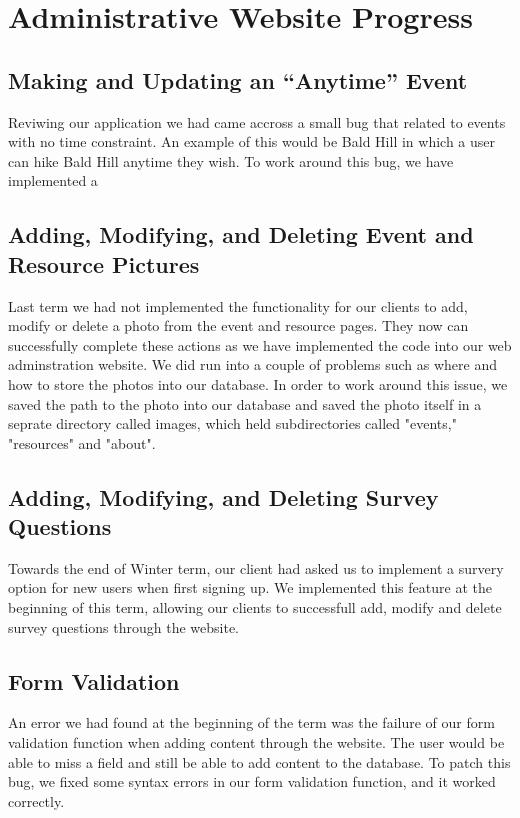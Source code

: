\documentclass[onecolumn, draftclsnofoot,10pt, compsoc]{IEEEtran}
\begin{document}
\section{Administrative Website Progress}

  \subsection{Making and Updating an “Anytime” Event}
  Reviwing our application we had came accross a small bug that related to events with no time constraint. An example of this would be Bald Hill in which a user can hike Bald Hill
  anytime they wish. To work around this bug, we have implemented a

  \subsection{Adding, Modifying, and Deleting Event and Resource Pictures}
  Last term we had not implemented the functionality for our clients to add, modify or delete a photo from the event and resource pages. They now can successfully complete these actions as we have implemented the code into our web adminstration website. We did run into a couple of problems such as where and how to store the photos into our database. In order to work around this issue, we saved the path to the photo into our database and saved the photo itself in a seprate directory called images, which held subdirectories called "events," "resources" and "about".

  \subsection{Adding, Modifying, and Deleting Survey Questions}
  Towards the end of Winter term, our client had asked us to implement a survery option for new users when first signing up. We implemented this feature at the beginning of this term, allowing our clients to successfull add, modify and delete survey questions through the website.

  \subsection{Form Validation}
  An error we had found at the beginning of the term was the failure of our form validation function when adding content through the website. The user would be able to miss a field and still be able to add content to the database. To patch this bug, we fixed some syntax errors in our form validation function, and it worked correctly.
\end{document}

